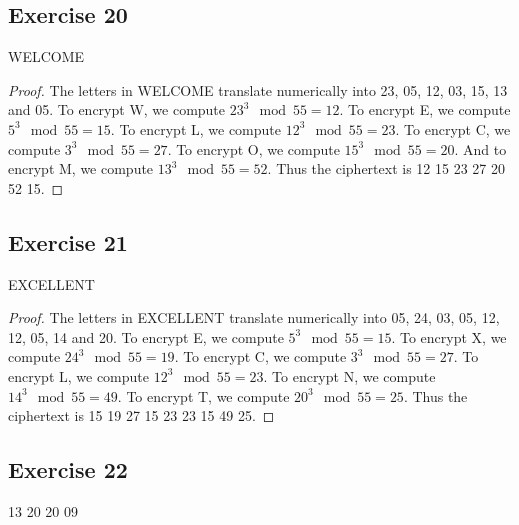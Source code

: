 \documentclass[14pt]{extarticle}
\begin{document}
\subsection{Exercise 20}
WELCOME

\begin{proof}
The letters in WELCOME translate numerically into 23, 05, 12, 03, 15, 13 and 05. To encrypt W, we compute \(23^3 \mod 
55 = 12\). To encrypt E, we compute \(5^3 \mod 55 = 15\). To encrypt L, we compute \(12^3 \mod 55 = 23\). To encrypt 
C, we compute \(3^3 \mod 55 = 27\). To encrypt O, we compute \(15^3 \mod 55 = 20\). And to encrypt M, we compute 
\(13^3 \mod 55 = 52\). Thus the ciphertext is 12 15 23 27 20 52 15.
\end{proof}

\subsection{Exercise 21}
EXCELLENT

\begin{proof}
The letters in EXCELLENT translate numerically into 05, 24,  03, 05, 12, 12, 05, 14 and 20. To encrypt E, we compute 
\(5^3 \mod 55 = 15\). To encrypt X, we compute \(24^3 \mod 55 = 19\). To encrypt C, we compute \(3^3 \mod 55 = 27\). 
To encrypt L, we compute \(12^3 \mod 55 = 23\). To encrypt N, we compute \(14^3 \mod 55 = 49\). To encrypt T, we 
compute \(20^3 \mod 55 = 25\). Thus the ciphertext is 15 19 27 15 23 23 15 49 25.
\end{proof}

\subsection{Exercise 22}
13 20 20 09
\end{document}
